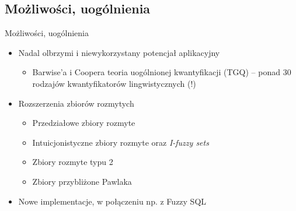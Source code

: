 \documentclass{beamer}
\begin{document}
\subsection{Możliwości, uogólnienia}
\begin{frame}{Możliwości, uogólnienia}%
\begin{itemize}
	\item <1->Nadal olbrzymi i \alert<1->{niewykorzystany potencjał
aplikacyjny}
 \begin{itemize}
	\item<1-> Barwise'a i Coopera teoria uogólnionej kwantyfikacji (TGQ) -- ponad
30 rodzajów kwantyfikatorów lingwistycznych (!)
\end{itemize}
\item <2-> \alert<2>{Rozszerzenia zbiorów rozmytych}
	\begin{itemize}
		\item Przedziałowe zbiory rozmyte
		\item Intuicjonistyczne zbiory rozmyte oraz {\em I-fuzzy sets}
		\item Zbiory rozmyte typu 2
		\item Zbiory przybliżone Pawlaka
	\end{itemize}
\item <3-> \alert<3->{Nowe implementacje}, w połączeniu np. z Fuzzy SQL
\end{itemize}
\end{frame}
\end{document}
